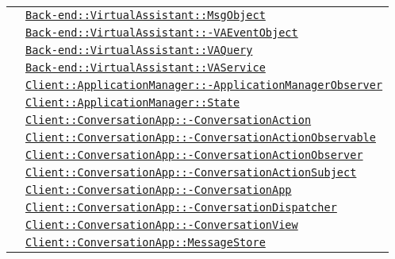 \begin{longtable}{|>{\centering}m{3cm}|m{10cm}<{\centering}|}
& \hyperref[Back-end::VirtualAssistant::MsgObject]{\texttt{Back-end::VirtualAssistant::MsgObject}}\\
& \hyperref[Back-end::VirtualAssistant::VAEventObject]{\texttt{Back-end::VirtualAssistant::-\linebreak VAEventObject}}\\
& \hyperref[Back-end::VirtualAssistant::VAQuery]{\texttt{Back-end::VirtualAssistant::VAQuery}}\\
& \hyperref[Back-end::VirtualAssistant::VAService]{\texttt{Back-end::VirtualAssistant::VAService}}\\
& \hyperref[Client::ApplicationManager::ApplicationManagerObserver]{\texttt{Client::ApplicationManager::-\linebreak ApplicationManagerObserver}}\\
& \hyperref[Client::ApplicationManager::State]{\texttt{Client::ApplicationManager::State}}\\
& \hyperref[Client::ConversationApp::ConversationAction]{\texttt{Client::ConversationApp::-\linebreak ConversationAction}}\\
& \hyperref[Client::ConversationApp::ConversationActionObservable]{\texttt{Client::ConversationApp::-\linebreak ConversationActionObservable}}\\
& \hyperref[Client::ConversationApp::ConversationActionObserver]{\texttt{Client::ConversationApp::-\linebreak ConversationActionObserver}}\\
& \hyperref[Client::ConversationApp::ConversationActionSubject]{\texttt{Client::ConversationApp::-\linebreak ConversationActionSubject}}\\
& \hyperref[Client::ConversationApp::ConversationApp]{\texttt{Client::ConversationApp::-\linebreak ConversationApp}}\\
& \hyperref[Client::ConversationApp::ConversationDispatcher]{\texttt{Client::ConversationApp::-\linebreak ConversationDispatcher}}\\
& \hyperref[Client::ConversationApp::ConversationView]{\texttt{Client::ConversationApp::-\linebreak ConversationView}}\\
& \hyperref[Client::ConversationApp::MessageStore]{\texttt{Client::ConversationApp::MessageStore}}\\

\end{longtable}
